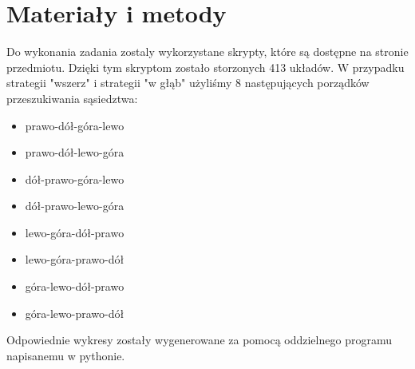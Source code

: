 \documentclass{classrep}
\begin{document}
    \section{Materiały i metody} {
        Do wykonania zadania zostaly wykorzystane skrypty, które są dostępne na stronie przedmiotu. Dzięki tym skryptom zostało storzonych 413 układów. W przypadku strategii "wszerz" i strategii "w głąb" użyliśmy 8 następujących porządków przeszukiwania sąsiedztwa:
        \begin{itemize}
            \item prawo-dół-góra-lewo
            \item prawo-dół-lewo-góra
            \item dół-prawo-góra-lewo
            \item dół-prawo-lewo-góra
            \item lewo-góra-dół-prawo
            \item lewo-góra-prawo-dół
            \item góra-lewo-dół-prawo
            \item góra-lewo-prawo-dół
        \end{itemize}
        \bigskip
    Odpowiednie wykresy zostały wygenerowane za pomocą oddzielnego programu napisanemu w pythonie.
    }
\end{document}
